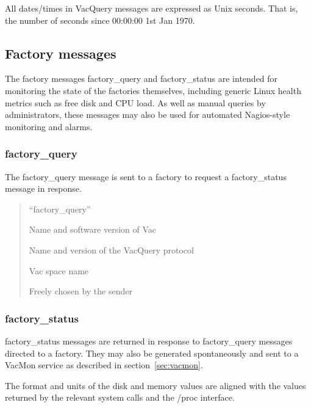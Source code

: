 \documentclass[12pt,a4paper]{article}
\begin{document}
All dates/times in VacQuery messages are expressed as Unix seconds. That
is, the number of seconds since 00:00:00 1st Jan 1970.

\subsection{Factory messages}
\label{sec:factorymessages}

The factory messages factory\_query and factory\_status are intended
for monitoring the state of the factories themselves, including
generic Linux health metrics such as free disk and CPU load. As well
as manual queries by administrators, these messages may also be
used for automated Nagios-style monitoring and alarms.

\subsubsection{factory\_query}
\label{sec:factoryquery}

The factory\_query message is sent to a factory to request a 
factory\_status message in response.

\begin{quote}
\begin{description}
\setlength{\parskip}{0pt}
\item[message\_type] ``factory\_query''
\item[vac\_version] Name and software version of Vac
\item[vacquery\_version] Name and version of the VacQuery protocol
\item[space] Vac space name
\item[cookie] Freely chosen by the sender
\end{description}
\end{quote}

\subsubsection{factory\_status}
\label{sec:factorystatus}

factory\_status messages are returned in response to 
factory\_query messages directed to a factory. They may
also be generated spontaneously and sent to a VacMon
service as described in section~\ref{sec:vacmon}.

The format and units of the disk and memory values are
aligned with the values returned by the relevant system
calls and the /proc interface.
\end{document}

